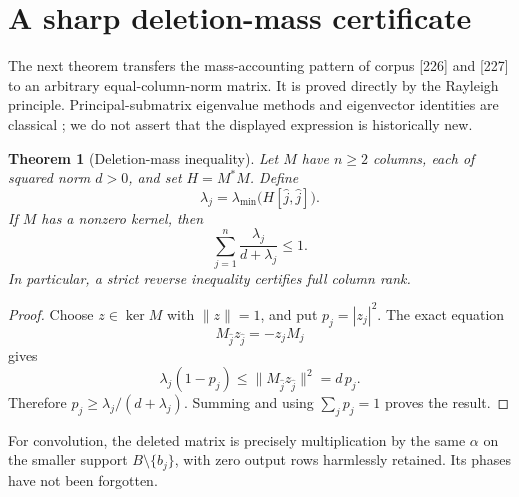 \documentclass[11pt,a4paper,oneside]{report}
\newtheorem{theorem}{Theorem}[section]
\theoremstyle{definition}
\theoremstyle{remark}
\begin{document}
\section{A sharp deletion-mass certificate}
The next theorem transfers the mass-accounting pattern of corpus [226] and [227] to an arbitrary equal-column-norm matrix. It is proved directly by the Rayleigh principle. Principal-submatrix eigenvalue methods and eigenvector identities are classical \cite{B:DPTZ}; we do not assert that the displayed expression is historically new.
\begin{theorem}[Deletion-mass inequality]\label{M02:thm:deletion}
Let \(M\) have \(n\ge2\) columns, each of squared norm \(d>0\), and set \(H=M^*M\). Define
\[
\lambda_j=\lambda_{\min}\bigl(H[\widehat j,\widehat j]\bigr).
\]
If \(M\) has a nonzero kernel, then
\begin{equation}\label{M02:eq:budget}
\boxed{\ \sum_{j=1}^n\frac{\lambda_j}{d+\lambda_j}\le1.\ }
\end{equation}
In particular, a strict reverse inequality certifies full column rank.
\end{theorem}
\begin{proof}
Choose \(z\in\ker M\) with \(\|z\|=1\), and put \(p_j=|z_j|^2\). The exact equation
\[
M_{\widehat j}z_{\widehat j}=-z_jM_j
\]
gives
\[
\lambda_j(1-p_j)
\le\|M_{\widehat j}z_{\widehat j}\|^2
=d\,p_j.
\]
Therefore \(p_j\ge\lambda_j/(d+\lambda_j)\). Summing and using \(\sum_jp_j=1\) proves the result.
\end{proof}
For convolution, the deleted matrix is precisely multiplication by the same \(\alpha\) on the smaller support \(B\setminus\{b_j\}\), with zero output rows harmlessly retained. Its phases have not been forgotten.
\end{document}
